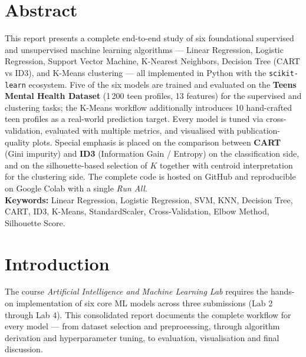 \documentclass[11pt,a4paper]{article}
\begin{document}
\section*{Abstract}

This report presents a complete end-to-end study of six foundational supervised and
unsupervised machine learning algorithms — Linear Regression, Logistic Regression,
Support Vector Machine, K-Nearest Neighbors, Decision Tree (CART vs ID3), and
K-Means clustering — all implemented in Python with the
\texttt{scikit-learn} ecosystem. Five of the six models are trained and evaluated
on the \textbf{Teens Mental Health Dataset} (1\,200 teen profiles, 13 features) for
the supervised and clustering tasks; the K-Means workflow additionally introduces
10 hand-crafted teen profiles as a real-world prediction target. Every model is
tuned via cross-validation, evaluated with multiple metrics, and visualised with
publication-quality plots. Special emphasis is placed on the comparison between
\textbf{CART} (Gini impurity) and \textbf{ID3} (Information Gain / Entropy) on the
classification side, and on the silhouette-based selection of $K$ together with
centroid interpretation for the clustering side. The complete code is hosted on
GitHub and reproducible on Google Colab with a single \emph{Run All}.\\[4pt]
\textbf{Keywords:} Linear Regression, Logistic Regression, SVM, KNN, Decision
Tree, CART, ID3, K-Means, StandardScaler, Cross-Validation, Elbow Method,
Silhouette Score.

\tableofcontents

\newpage
\section{Introduction}

The course \emph{Artificial Intelligence and Machine Learning Lab} requires the
hands-on implementation of six core ML models across three submissions
(Lab 2 through Lab 4). This consolidated report documents the complete
workflow for every model — from dataset selection and preprocessing, through
algorithm derivation and hyperparameter tuning, to evaluation, visualisation
and final discussion.
\end{document}
